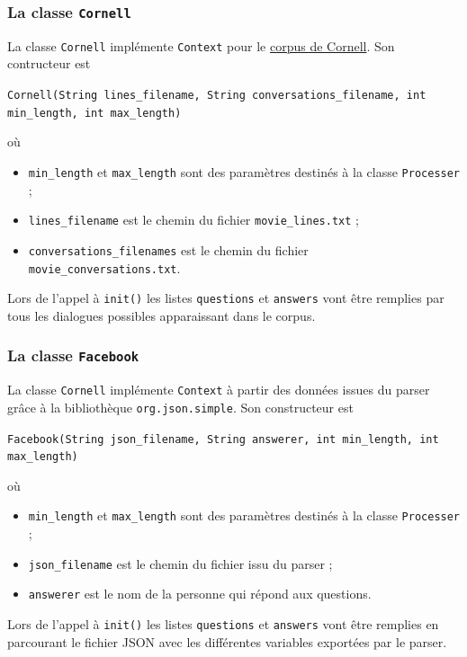 \documentclass[10pt,a4paper]{article}
\newcommand\tab[1][0.5cm]{\hspace*{#1}}
\begin{document}
\subsubsection{La classe \texttt{Cornell}}
La classe \texttt{Cornell} implémente \texttt{Context} pour le \href{https://www.cs.cornell.edu/~cristian/Cornell_Movie-Dialogs_Corpus.html}{corpus de Cornell}. Son contructeur est
\begin{center}
	\texttt{Cornell(String lines\_filename, String conversations\_filename, int min\_length, int max\_length)}
\end{center}
où
\begin{itemize}
	\item \texttt{min\_length} et \texttt{max\_length} sont des paramètres destinés à la classe \texttt{Processer} ;
	\item \texttt{lines\_filename} est le chemin du fichier \texttt{movie\_lines.txt} ;
	\item \texttt{conversations\_filenames} est le chemin du fichier \texttt{movie\_conversations.txt}.
\end{itemize}
\tab Lors de l'appel à \texttt{init()} les listes \texttt{questions} et \texttt{answers} vont être remplies par tous les dialogues possibles apparaissant dans le corpus.
\subsubsection{La classe \texttt{Facebook}}
La classe \texttt{Cornell} implémente \texttt{Context} à partir des données issues du parser grâce à la bibliothèque \texttt{org.json.simple}. Son constructeur est
\begin{center}
	\texttt{Facebook(String json\_filename, String answerer, int min\_length, int max\_length)}
\end{center}
où
\begin{itemize}
	\item \texttt{min\_length} et \texttt{max\_length} sont des paramètres destinés à la classe \texttt{Processer} ;
	\item \texttt{json\_filename} est le chemin du fichier issu du parser ;
	\item \texttt{answerer} est le nom de la personne qui répond aux questions.
\end{itemize}
\tab  Lors de l'appel à \texttt{init()} les listes \texttt{questions} et \texttt{answers} vont être remplies en parcourant le fichier JSON avec les différentes variables exportées par le parser.
\end{document}
